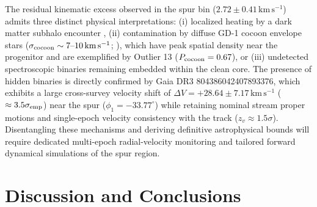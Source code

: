 \documentclass[twocolumn]{aastex631}
\begin{document}
The residual kinematic excess observed in the spur bin ($2.72 \pm 0.41\,\mathrm{km\,s^{-1}}$) admits three distinct physical interpretations: (i) localized heating by a dark matter subhalo encounter \citep{Nibauer2026}, (ii) contamination by diffuse GD-1 cocoon envelope stars ($\sigma_{\rm cocoon} \sim 7\text{--}10\,\mathrm{km\,s^{-1}}$; \citealt{Jarvis2026}), which have peak spatial density near the progenitor and are exemplified by Outlier 13 ($P_{\rm cocoon} = 0.67$), or (iii) undetected spectroscopic binaries remaining embedded within the clean core. The presence of hidden binaries is directly confirmed by Gaia DR3 804386042407893376, which exhibits a large cross-survey velocity shift of $\Delta V = +28.64 \pm 7.17\,\mathrm{km\,s^{-1}}$ ($\approx 3.5\sigma_{\rm emp}$) near the spur ($\phi_1 = -33.77^\circ$) while retaining nominal stream proper motions and single-epoch velocity consistency with the track ($z_v \approx 1.5\sigma$). Disentangling these mechanisms and deriving definitive astrophysical bounds will require dedicated multi-epoch radial-velocity monitoring and tailored forward dynamical simulations of the spur region.

\section{Discussion and Conclusions}
\label{sec:concl}
\end{document}
